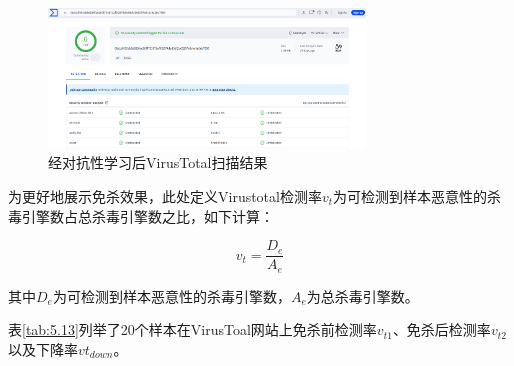 
\begin{figure}[htbp]
	\centering
	\includegraphics[width=0.75\textwidth]{figures/5.3}
	\caption{经对抗性学习后VirusTotal扫描结果}\label{fig:5.3}
\end{figure}


为更好地展示免杀效果，此处定义Virustotal检测率$v_t$为可检测到样本恶意性的杀毒引擎数占总杀毒引擎数之比，如下计算： 

\begin{equation}
v_t = \frac{D_e}{A_e}
\tag{5.9}
\end{equation}

其中$D_e$为可检测到样本恶意性的杀毒引擎数，$A_e$为总杀毒引擎数。


表\ref{tab:5.13}列举了20个样本在VirusToal网站上免杀前检测率$v_{t1}$、免杀后检测率$v_{t2}$以及下降率$vt_{down}$。


